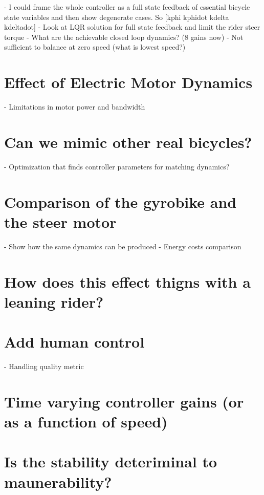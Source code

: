 \documentclass[12pt]{article}
\begin{document}
- I could frame the whole controller as a full state feedback of essential
bicycle state variables and then show degenerate cases. So [kphi kphidot kdelta
kdeltadot]
- Look at LQR solution for full state feedback and limit the rider steer torque
- What are the achievable closed loop dynamics? (8 gains now)
- Not sufficient to balance at zero speed (what is lowest speed?)

\section{Effect of Electric Motor Dynamics}

- Limitations in motor power and bandwidth

\section{Can we mimic other real bicycles?}

- Optimization that finds controller parameters for matching dynamics?

\section{Comparison of the gyrobike and the steer motor}

- Show how the same dynamics can be produced
- Energy costs comparison

\section{How does this effect thigns with a leaning rider?}

\section{Add human control}

- Handling quality metric

\section{Time varying controller gains (or as a function of speed)}

\section{Is the stability deteriminal to maunerability?}
\end{document}
